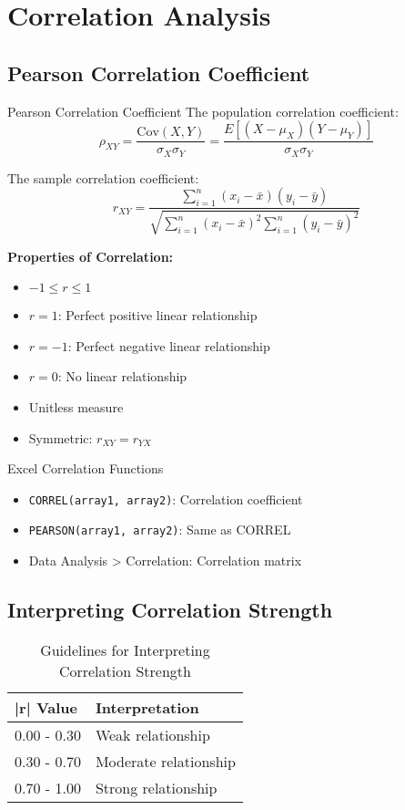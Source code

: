 \documentclass[12pt,a4paper]{book}
\begin{document}
\section{Correlation Analysis}

\subsection{Pearson Correlation Coefficient}

\begin{definition}{Pearson Correlation Coefficient}
The population correlation coefficient:
\[
\rho_{XY} = \frac{\text{Cov}(X,Y)}{\sigma_X \sigma_Y} = \frac{E[(X-\mu_X)(Y-\mu_Y)]}{\sigma_X \sigma_Y}
\]

The sample correlation coefficient:
\[
r_{XY} = \frac{\sum_{i=1}^{n}(x_i - \bar{x})(y_i - \bar{y})}{\sqrt{\sum_{i=1}^{n}(x_i - \bar{x})^2 \sum_{i=1}^{n}(y_i - \bar{y})^2}}
\]
\end{definition}

\textbf{Properties of Correlation:}
\begin{itemize}
    \item $-1 \leq r \leq 1$
    \item $r = 1$: Perfect positive linear relationship
    \item $r = -1$: Perfect negative linear relationship
    \item $r = 0$: No linear relationship
    \item Unitless measure
    \item Symmetric: $r_{XY} = r_{YX}$
\end{itemize}

\begin{example}{Excel Correlation Functions}
\begin{itemize}
    \item \texttt{CORREL(array1, array2)}: Correlation coefficient
    \item \texttt{PEARSON(array1, array2)}: Same as CORREL
    \item Data Analysis > Correlation: Correlation matrix
\end{itemize}
\end{example}

\subsection{Interpreting Correlation Strength}

\begin{table}[H]
\centering
\caption{Guidelines for Interpreting Correlation Strength}
\begin{tabular}{@{}ll@{}}
\toprule
\textbf{|r| Value} & \textbf{Interpretation} \\
\midrule
0.00 - 0.30 & Weak relationship \\
0.30 - 0.70 & Moderate relationship \\
0.70 - 1.00 & Strong relationship \\
\bottomrule
\end{tabular}
\end{table}
\end{document}
